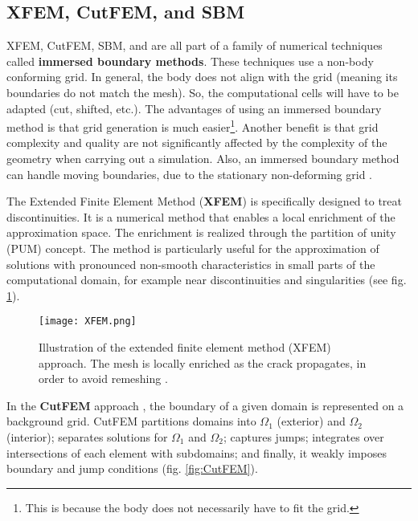\subsection{XFEM, CutFEM, and SBM}

XFEM, CutFEM, SBM, and \phifem are all part of a family of numerical techniques called \textbf{immersed boundary methods}. These techniques use a non-body conforming grid. In general, the body does not align with the grid (meaning its boundaries do not match the mesh). So, the computational cells will have to be adapted (cut, shifted, etc.). The advantages of using an immersed boundary method is that grid generation is much easier\footnote{This is because the body does not necessarily have to fit the grid.}. Another benefit is that grid complexity and quality are not significantly affected by the complexity of the geometry when carrying out a simulation. Also, an immersed boundary method can handle moving boundaries, due to the stationary non-deforming grid \parencite{bandringa2010immersed}.

The Extended Finite Element Method (\textbf{XFEM}) \parencite{moes1999finite} is specifically designed to treat discontinuities. It is a numerical method that enables a local enrichment of the approximation space. The enrichment is realized through the partition of unity (PUM) concept. The method is particularly useful for the approximation of solutions with pronounced non-smooth characteristics in small parts of the computational domain, for example near discontinuities and singularities (see fig. \ref{fig:XFEM}).
\begin{figure}[H]
    \centering
    \texttt{[image: XFEM.png]}
    \caption{Illustration of the extended finite element method (XFEM) approach. The mesh is locally enriched as the crack propagates, in order to avoid remeshing \parencite{de2018delamination}.}
    \label{fig:XFEM}
\end{figure}


In the \textbf{CutFEM} approach \parencite{burman2010fictitious}, the boundary of a given domain is represented on a background grid. CutFEM partitions domains into $\Omega_1$ (exterior) and $\Omega_2$ (interior); separates solutions for $\Omega_1$ and $\Omega_2$; captures jumps; integrates over intersections of each element with subdomains; and finally, it weakly imposes boundary and jump conditions (fig. \ref{fig:CutFEM}). 

